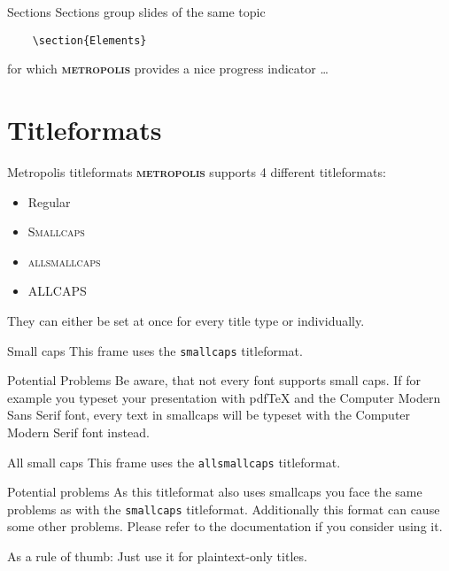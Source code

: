 \documentclass[10pt]{beamer}
\newcommand{\themename}{\textbf{\textsc{metropolis}}\xspace}
\begin{document}
\begin{frame}[fragile]{Sections}
  Sections group slides of the same topic

  \begin{verbatim}    \section{Elements}\end{verbatim}

  for which \themename provides a nice progress indicator \ldots
\end{frame}

\section{Titleformats}

\begin{frame}{Metropolis titleformats}
    \themename supports 4 different titleformats:
    \begin{itemize}
        \item Regular
        \item \textsc{Smallcaps}
        \item \textsc{allsmallcaps}
        \item ALLCAPS
    \end{itemize}
    They can either be set at once for every title type or individually.
\end{frame}

{
\begin{frame}{Small caps}
    This frame uses the \texttt{smallcaps} titleformat.

    \begin{alertblock}{Potential Problems}
        Be aware, that not every font supports small caps. If for example you typeset your presentation with pdfTeX and the Computer Modern Sans Serif font, every text in smallcaps will be typeset with the Computer Modern Serif font instead.
    \end{alertblock}
\end{frame}
}

{
\begin{frame}{All small caps}
    This frame uses the \texttt{allsmallcaps} titleformat.

    \begin{alertblock}{Potential problems}
        As this titleformat also uses smallcaps you face the same problems as with the \texttt{smallcaps} titleformat. Additionally this format can cause some other problems. Please refer to the documentation if you consider using it.

        As a rule of thumb: Just use it for plaintext-only titles.
    \end{alertblock}
\end{frame}
}
\end{document}
